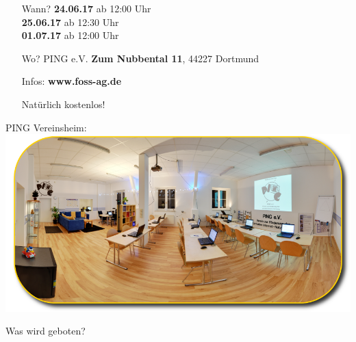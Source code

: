 \documentclass{beamer}
\begin{document}
\begin{frame}
		\vspace{0.2cm}
		\begin{minipage}{0.56\linewidth}
			\begin{itemize}
				\item[Wann?] \textbf{24.06.17} ab 12:00 Uhr \\
				\textbf{25.06.17} ab 12:30 Uhr\\
				\textbf{01.07.17} ab 12:00 Uhr
				\item[Wo?] PING e.V. \textbf{Zum Nubbental 11}, 44227 Dortmund
				\item[Infos:] \textbf{www.foss-ag.de}
				\item[] Natürlich kostenlos!
			\end{itemize}
		\end{minipage}
		\begin{minipage}{0.35\linewidth}
			{\scriptsize \hspace{0.03cm} PING Vereinsheim: \\ }
			\includegraphics[scale=0.37]{resources/weiterbildung-schulungsraum}
		\end{minipage}
	
		\vspace{0.5cm}
		Was wird geboten?
	

\end{frame}
\end{document}

